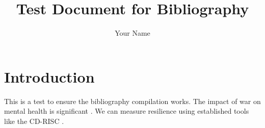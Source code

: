 \documentclass[12pt]{article}
\title{Test Document for Bibliography}
\author{Your Name}
\date{}
\begin{document}
\maketitle

\section{Introduction}
This is a test to ensure the bibliography compilation works. The impact of war on mental health is significant \cite{murthy2006mental}. We can measure resilience using established tools like the CD-RISC \cite{connor2003development}.

\end{document}
